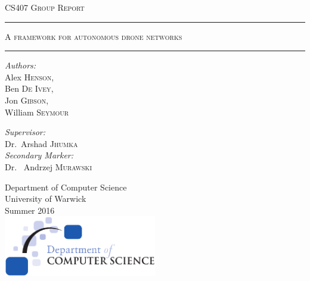 \documentclass[10pt,a4paper,twoside]{report}
\begin{document}
\begin{titlepage}
\begin{center}

\textsc{\LARGE CS407 Group Report}\\[1.5cm]
\vspace{1.5cm}

\hrule
\vspace{0.2cm}
\textsc{\LARGE A framework for autonomous drone networks}\\
\vspace{0.2cm}
\hrule

\vspace{1.5cm}
\noindent
\begin{minipage}{0.4\textwidth}
	\begin{flushleft} \large
		\emph{Authors:}\\
		Alex \textsc{Henson}, \\ Ben \textsc{De Ivey}, \\ Jon \textsc{Gibson}, \\ William \textsc{Seymour} 
	\end{flushleft}
\end{minipage}%
\begin{minipage}{0.4\textwidth}
	\begin{flushright} \large
		\emph{Supervisor:} \\
		Dr.~Arshad \textsc{Jhumka} \\
		\emph{Secondary Marker:} \\
		Dr.~ Andrzej \textsc{Murawski} 
	\end{flushright}
\end{minipage}
\vfill
\large Department of Computer Science\\
\large University of Warwick\\
\large Summer 2016\\
\vfill
\includegraphics[width=0.50\textwidth]{img/dcslogo.png}~\\[1cm]
\end{center}
\end{titlepage}


\tableofcontents
\listoffigures
\listoftables
\end{document}
